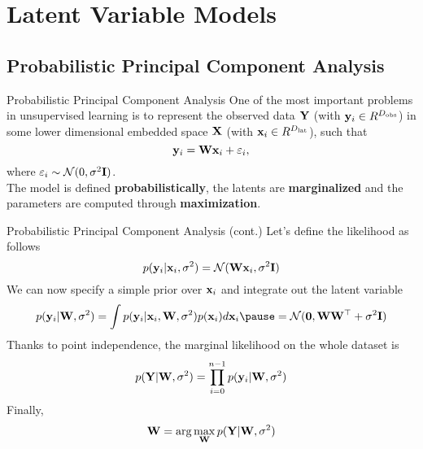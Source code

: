 
\section{Latent Variable Models}
\label{cap:lvm}

\subsection{Probabilistic Principal Component Analysis}
\begin{frame}{Probabilistic Principal Component Analysis}
    One of the most important problems in unsupervised learning is to represent the observed data $\mathbf{Y}$ (with $\mathbf{y}_i \in R^{D_\mathrm{obs}}$) in some lower dimensional embedded space $\mathbf{X}$ (with $\mathbf{x}_i \in R^{D_\mathrm{lat}}$), such that
    \begin{equation}
        \mathbf{y}_i = \mathbf{W}\mathbf{x}_i + \varepsilon_i,
    \end{equation}
    where $\varepsilon_i \sim \mathcal{N}(0, \sigma^2\mathbf{I})$.\\
    \pause
    \vspace{0.5cm}
    The model is defined \textbf{probabilistically}, the latents are \textbf{marginalized} and the parameters are computed through \textbf{maximization}.\\
\end{frame}

\begin{frame}{Probabilistic Principal Component Analysis (cont.)}
    Let's define the likelihood as follows
    \begin{equation}
        p(\mathbf{y}_i\vert\mathbf{x}_i,\sigma^2) = \mathcal{N}(\mathbf{W}\mathbf{x}_i, \sigma^2\mathbf{I})
    \end{equation}
    \pause
    We can now specify a simple prior over $\mathbf{x}_i$ and integrate out the latent variable
    \begin{equation}
        p(\yvect_i\vert\Wvect, \sigma^2) = \int p(\yvect_i\vert\xvect_i,\Wvect, \sigma^2) p(\xvect_i) d\xvect_i \pause = \N (\zerovect, \Wvect\Wvect^\top+\sigma^2\Ivect)
    \end{equation}
    \pause
    Thanks to point independence, the marginal likelihood on the whole dataset is
    \begin{equation}
        p(\mathbf{Y}\vert\mathbf{W}, \sigma^2) = \prod_{i=0}^{n-1} p(\mathbf{y}_i\vert\mathbf{W}, \sigma^2)
    \end{equation}
    \pause
    Finally,
    \begin{equation}
        \mathbf{W} = \arg\max_{\mathbf{W}} p(\mathbf{Y}\vert\mathbf{W}, \sigma^2)
    \end{equation}
\end{frame}

